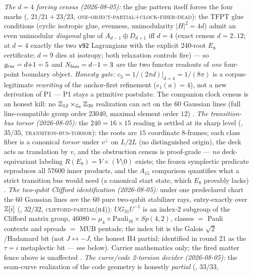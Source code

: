 \emph{The $d=4$ forcing census (2026-08-05):} the glue pattern
itself forces the four marks
(, $21/21+23/23$,
\textsc{one-object-partial}$+$\textsc{clock-fiber-dead}): the TFPT
glue conditions (cyclic isotropic glue, evenness, unimodularity
$|H|^2=4d$) admit an even unimodular \emph{diagonal} glue of
$A_{d-1}\oplus D_{d+1}$ iff $d=4$ (exact census $d=2..12$; at
$d=4$ exactly the two \texttt{v92} Lagrangians with the explicit
$240$-root $E_8$ certificate; $d=9$ dies at isotropy; both
relaxation controls fire) --- so $g_{\mathrm{car}}=d{+}1=5$ and
$N_{\mathrm{fam}}=d{-}1=3$ are the two functor readouts of \emph{one}
four-point boundary object.  \emph{Honesty gate:}
$c_3=1/(2\pi d)|_{d=4}=1/(8\pi)$ is a corpus-legitimate
\emph{rewriting} of the anchor-first refinement ($e_1(a)=4$), not
a new derivation of P1 --- P1 stays a primitive postulate.  The
companion clock census is an honest kill: no
$\mathbb{Z}_{12}\times_{\mathbb{Z}_6}\mathbb{Z}_{30}$ realization can act on the $60$
Gaussian lines (full line-compatible group order $23040$, maximal
element order $12$) \mE.
\emph{The transition-bus torsor (2026-08-05):} the $240=16\times15$
reading is settled at its sharp level
(, $35/35$,
\textsc{transition-bus-torsor}): the roots are $15$ coordinate
$8$-frames; each class fiber is a canonical \emph{torsor} under
$v^\perp$ on $L/2L$ (no distinguished origin), the deck acts as
translation by $v$, and the obstruction census is proof-grade ---
\emph{no} deck-equivariant labeling $R(E_8)=V\times(V\setminus0)$
exists; the frozen symplectic predicate reproduces all $57600$
inner products, and the $A_{15}$ comparison quantifies what a
strict transition bus would need (a canonical start state, which
$E_8$ provably lacks) \mE.
\emph{The two-qubit Clifford identification (2026-08-05):} under
one predeclared chart the $60$ Gaussian lines \emph{are} the $60$
pure two-qubit stabilizer rays, entry-exactly over $\mathbb{Z}[i]$
(, $32/32$,
\textsc{clifford-partial(h4)}): $UG_{31}U^{-1}$ is an index-2
subgroup of the Clifford matrix group,
$46080=\mu_4\times\mathrm{Pauli}_{16}\times Sp(4,2)$, classes $=$
Pauli contexts and spreads $=$ MUB pentads; the index bit is the
Galois $\sqrt2$/Hadamard bit (not $J\leftrightarrow-J$, the honest
H4 partial; identified in round 21 as the $\tau=i$ metaplectic bit
--- see below).  Carrier mathematics only; the fired matter fence
above is unaffected \mE.
\emph{The curve/code 2-torsion decider (2026-08-05):} the
seam-curve realization of the code geometry is honestly
\emph{partial}
(, $33/33$,

